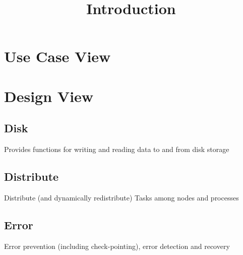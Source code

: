 \documentclass{book}
\begin{document}

\tableofcontents

\title{Introduction} \label{s:intro}


\chapter{Use Case View}

\chapter{Design View}


\section{Disk}

Provides functions for writing and reading data to and from disk
storage

\section{Distribute}

Distribute (and dynamically redistribute) Tasks among nodes and
processes

\section{Error}

Error prevention (including check-pointing), error detection and
recovery
\end{document}
